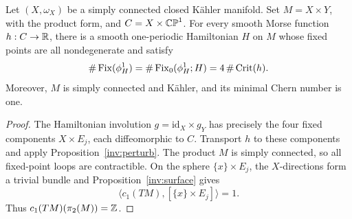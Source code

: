 \begin{corollary}\label{inv:realization}
Let $(X,\omega_X)$ be a simply connected closed K\"ahler manifold.
Set $M=X\times Y$, with the product form, and $C=X\times\mathbb {CP}^1$.
For every smooth Morse function $h:C\to\mathbb R$, there is a smooth
one-periodic Hamiltonian $H$ on $M$ whose fixed points are all
nondegenerate and satisfy
\[
  \#\operatorname{Fix}(\phi_H^1)=\#\operatorname{Fix}_0(\phi_H^1;H)
  =4\,\#\operatorname{Crit}(h).
\]
Moreover, $M$ is simply connected and K\"ahler, and its minimal Chern
number is one.
\end{corollary}

\begin{proof}
The Hamiltonian involution $g=\mathrm{id}_X\times g_Y$ has precisely
the four fixed components $X\times E_j$, each diffeomorphic to $C$.
Transport $h$ to these components and apply
Proposition~\ref{inv:perturb}. The product $M$ is simply connected,
so all fixed-point loops are contractible. On the sphere
$\{x\}\times E_j$, the $X$-directions form a trivial bundle and
Proposition~\ref{inv:surface} gives
\[
  \langle c_1(TM),[\{x\}\times E_j]\rangle=1.
\]
Thus $c_1(TM)(\pi_2(M))=\mathbb Z$.
\end{proof}
